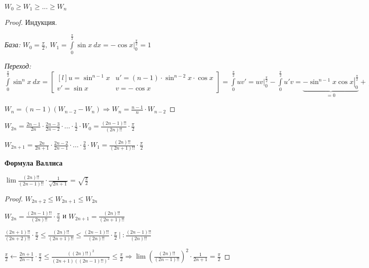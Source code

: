 \begin{statement}
    $W_0\geq W_1\geq ...\geq W_n$
    
\end{statement}

\begin{proof}
    Индукция.

    \textit{База:} $W_0=\frac{\pi}{2},\ W_1=\int\limits_0^{\frac{\pi}{2}}\sin x\ dx=\left.-\cos x\right|_0^{\frac{\pi}{2}}=1$
    
    \textit{Переход:} $\int\limits_0^{\frac{\pi}{2}}\sin ^n x\ dx=\begin{bmatrix*}[l]
    u=\sin^{n-1}x & u'=(n-1)\cdot \sin^{n-2}x\cdot \cos x \\
    v'=\sin x\ & v=-\cos x
    \end{bmatrix*}=\int\limits_0^{\frac{\pi}{2}}uv'=\left.uv\right|_0^{\frac{\pi}{2}}-\int\limits_0^{\frac{\pi}{2}}u'v=\underbrace{\left.-\sin ^{n-1}x\cos x\right|_0^{\frac{\pi}{2}}}_{=0}+\int\limits_0^{\frac{\pi}{2}}(n-1)\sin ^{n-2}x\cos ^2 x\ dx=(n-1)\int\limits_0^{\frac{\pi}{2}}\sin^{n-2}x(1-\sin^2 x)dx=(n-1)\bigg(\int\limits_0^{\frac{\pi}{2}}\sin^{n-2}x\ dx - \int\limits_0^{\frac{\pi}{2}}\sin^nx\ dx\bigg)=(n-1)(W_{n-2}-W_n)$

    $W_n=(n-1)(W_{n-2}-W_n)\Rightarrow W_n=\frac{n-1}{n}\cdot W_{n-2}$
\end{proof}

\begin{corollary}
    $W_{2n}=\frac{2n-1}{2n}\cdot\frac{2n-3}{2n-2}\cdot ...\cdot \frac{1}{2}\cdot W_0=\frac{(2n-1)!!}{(2n)!!}\cdot\frac{\pi}{2}$

    $W_{2n+1}=\frac{2n}{2n+1}\cdot\frac{2n-2}{2n-1}\cdot ...\cdot \frac{2}{3}\cdot W_1=\frac{(2n)!!}{(2n+1)!!}\cdot\frac{\pi}{2}$
\end{corollary}

\begin{theorem}
    \textbf{Формула Валлиса}

    $\lim \frac{(2n)!!}{(2n-1)!!}\cdot \frac{1}{\sqrt{2n+1}}=\sqrt{\frac{\pi}{2}}$
\end{theorem}

\begin{proof}
    $W_{2n+2}\leq W_{2n+1}\leq W_{2n}$

    $W_{2n}=\frac{(2n-1)!!}{(2n)!!}\cdot \frac{\pi}{2}$ и $W_{2n+1}=\frac{(2n)!!}{(2n+1)!!}$

    $\frac{(2n+1)!!}{(2n+2)!!}\cdot\frac{\pi}{2}\leq \frac{(2n)!!}{(2n+1)!!}\leq \frac{(2n-1)!!}{(2n)!!}\cdot\frac{\pi}{2}\ \bigg|\ :\frac{(2n-1)!!}{(2n)!!}$

    $\frac{\pi}{2}\leftarrow\frac{2n+1}{2n-1}\cdot\frac{\pi}{2}\leq \frac{((2n)!!)^2}{(2n+1)((2n-1)!!)^2}\leq \frac{\pi}{2}\Rightarrow \lim(\frac{(2n)!!}{(2n-1)!!})^2\cdot \frac{1}{2n+1}=\frac{\pi}{2}$
\end{proof}

